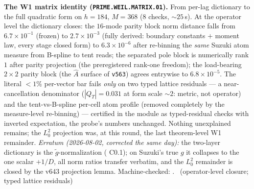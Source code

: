 \documentclass[11pt,a4paper]{article}
\theoremstyle{definition}
\begin{document}
\par\smallskip\noindent\textbf{The W1 matrix identity
(\texttt{PRIME.WEIL.MATRIX.01}).}
From per-lag dictionary to the full quadratic form on $h=184$,
$M=368$ ($8$ checks, ${\sim}25$\,s).  At the operator level the
dictionary closes: the $16$-mode parity block norm distance falls from
$6.7\times10^{-1}$ (frozen) to $2.7\times10^{-3}$ (fully derived:
boundary constants $+$ moment law, every stage closed form) to
$6.3\times10^{-6}$ after re-binning the \emph{same} Suzuki atom
measure from B-spline to tent reads; the separated pole block is
numerically rank $1$ after parity projection (the preregistered
rank-one freedom); the load-bearing $2\times2$ parity block (the
$\widehat A$ surface of \texttt{v563}) agrees entrywise to
$6.8\times10^{-5}$.  The literal $<1\%$ per-vector bar fails
\emph{only} on two typed lattice residuals --- a near-cancellation
denominator ($|Q_T|=0.031$ at form scale ${\sim}2$: metric, not
operator) and the tent-vs-B-spline per-cell atom profile (removed
completely by the measure-level re-binning) --- certified in the
module as typed-residual checks with inverted expectation, the probe's
numbers unchanged.  Nothing unexplained remains; the $L^2_0$
projection was, at this round, the last theorem-level W1 remainder.
\emph{Erratum (2026-08-02, corrected the same day):} the two-layer
dictionary is the $\tilde g$-normalization
( C0.1); on Suzuki's true $g$ it collapses
to the one scalar $+1/D$, all norm ratios transfer verbatim, and the
$L^2_0$ remainder is closed by the v643 projection lemma.
Machine-checked: .
\mE\ (operator-level closure; typed lattice residuals)
\par\smallskip
\end{document}

